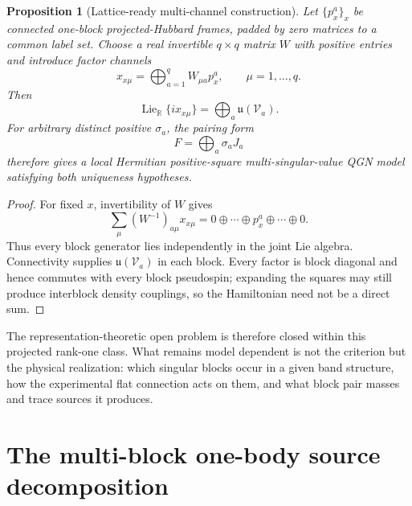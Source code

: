 \documentclass[11pt]{article}
\numberwithin{equation}{section}
\newtheorem{proposition}[theorem]{Proposition}
\newcommand{\cV}{\mathcal V}
\newcommand{\Lie}{\operatorname{Lie}}
\begin{document}
\begin{proposition}[Lattice-ready multi-channel construction]
\label{prop:lattice-ready}
Let $\{p_x^a\}_x$ be connected one-block projected-Hubbard frames, padded by zero matrices to a common label set.  Choose a real invertible $q\times q$ matrix $W$ with positive entries and introduce factor channels
\begin{equation}
 x_{x\mu}
 =
 \bigoplus_{a=1}^qW_{\mu a}p_x^a,
 \qquad
 \mu=1,\ldots,q.
 \label{eq:mixed-channel-factors}
\end{equation}
Then
\begin{equation}
 \Lie_{\mathbb R}\{ix_{x\mu}\}
 =
 \bigoplus_a\mathfrak u(\cV_a).
 \label{eq:mixed-channel-full}
\end{equation}
For arbitrary distinct positive $\sigma_a$, the pairing form
\begin{equation}
 F=\bigoplus_a\sigma_aJ_a
 \label{eq:mixed-channel-F}
\end{equation}
therefore gives a local Hermitian positive-square multi-singular-value QGN model satisfying both uniqueness hypotheses.
\end{proposition}

\begin{proof}
For fixed $x$, invertibility of $W$ gives
\begin{equation}
 \sum_\mu(W^{-1})_{a\mu}x_{x\mu}
 =
 0\oplus\cdots\oplus p_x^a\oplus\cdots\oplus0.
 \label{eq:invert-W}
\end{equation}
Thus every block generator lies independently in the joint Lie algebra.  Connectivity supplies $\mathfrak u(\cV_a)$ in each block.  Every factor is block diagonal and hence commutes with every block pseudospin; expanding the squares may still produce interblock density couplings, so the Hamiltonian need not be a direct sum.
\end{proof}

The representation-theoretic open problem is therefore closed within this projected rank-one class.  What remains model dependent is not the criterion but the physical realization: which singular blocks occur in a given band structure, how the experimental flat connection acts on them, and what block pair masses and trace sources it produces.

\section{The multi-block one-body source decomposition}
\end{document}
